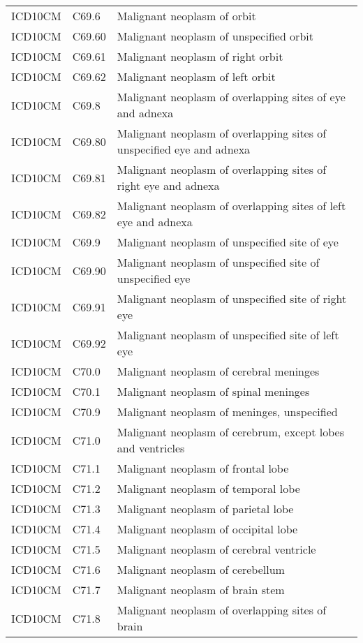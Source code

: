 \begin{table}[ht]
\begin{tabular}{lll}
  ICD10CM & C69.6 & Malignant neoplasm of orbit \\ 
  ICD10CM & C69.60 & Malignant neoplasm of unspecified orbit \\ 
  ICD10CM & C69.61 & Malignant neoplasm of right orbit \\ 
  ICD10CM & C69.62 & Malignant neoplasm of left orbit \\ 
  ICD10CM & C69.8 & Malignant neoplasm of overlapping sites of eye and adnexa \\ 
  ICD10CM & C69.80 & Malignant neoplasm of overlapping sites of unspecified eye and adnexa \\ 
  ICD10CM & C69.81 & Malignant neoplasm of overlapping sites of right eye and adnexa \\ 
  ICD10CM & C69.82 & Malignant neoplasm of overlapping sites of left eye and adnexa \\ 
  ICD10CM & C69.9 & Malignant neoplasm of unspecified site of eye \\ 
  ICD10CM & C69.90 & Malignant neoplasm of unspecified site of unspecified eye \\ 
  ICD10CM & C69.91 & Malignant neoplasm of unspecified site of right eye \\ 
  ICD10CM & C69.92 & Malignant neoplasm of unspecified site of left eye \\ 
  ICD10CM & C70.0 & Malignant neoplasm of cerebral meninges \\ 
  ICD10CM & C70.1 & Malignant neoplasm of spinal meninges \\ 
  ICD10CM & C70.9 & Malignant neoplasm of meninges, unspecified \\ 
  ICD10CM & C71.0 & Malignant neoplasm of cerebrum, except lobes and ventricles \\ 
  ICD10CM & C71.1 & Malignant neoplasm of frontal lobe \\ 
  ICD10CM & C71.2 & Malignant neoplasm of temporal lobe \\ 
  ICD10CM & C71.3 & Malignant neoplasm of parietal lobe \\ 
  ICD10CM & C71.4 & Malignant neoplasm of occipital lobe \\ 
  ICD10CM & C71.5 & Malignant neoplasm of cerebral ventricle \\ 
  ICD10CM & C71.6 & Malignant neoplasm of cerebellum \\ 
  ICD10CM & C71.7 & Malignant neoplasm of brain stem \\ 
  ICD10CM & C71.8 & Malignant neoplasm of overlapping sites of brain \\ 

\end{tabular}
\end{table}
